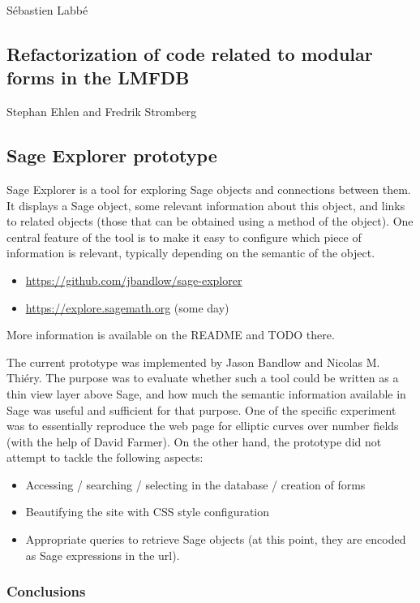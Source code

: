 \documentclass{article}
\begin{document}
S\'ebastien Labb\'e

\subsection{Refactorization of code related to modular forms in the LMFDB}
Stephan Ehlen and Fredrik Stromberg

\subsection{Sage Explorer prototype}

Sage Explorer is a tool for exploring Sage objects and connections
between them. It displays a Sage object, some relevant information
about this object, and links to related objects (those that can be
obtained using a method of the object).  One central feature of the
tool is to make it easy to configure which piece of information is
relevant, typically depending on the semantic of the object.

\begin{itemize}
\item[]	  \url{https://github.com/jbandlow/sage-explorer}
\item[]	  \url{https://explore.sagemath.org} (some day)
\end{itemize}

More information is available on the README and TODO there.

The current prototype was implemented by Jason Bandlow and Nicolas
M. Thi\'ery. The purpose was to evaluate whether such a tool could be
written as a thin view layer above Sage, and how much the semantic
information available in Sage was useful and sufficient for that
purpose. One of the specific experiment was to essentially reproduce
the web page for elliptic curves over number fields (with the help of
David Farmer). On the other hand, the prototype did not attempt to
tackle the following aspects:

\begin{itemize}
\item Accessing / searching / selecting in the database / creation of forms
\item Beautifying the site with CSS style configuration
\item Appropriate queries to retrieve Sage objects (at this point,
  they are encoded as Sage expressions in the url).
\end{itemize}

\subsubsection{Conclusions}
\end{document}
